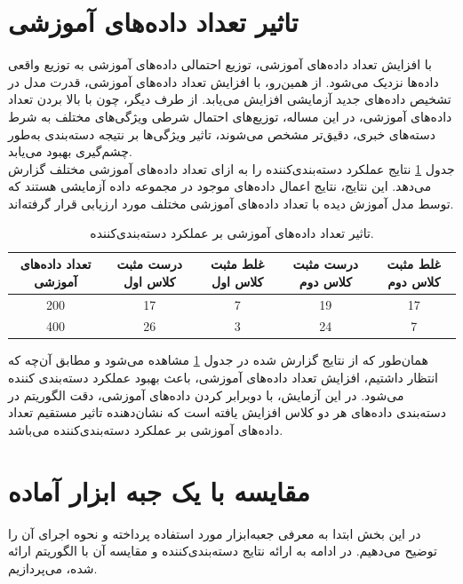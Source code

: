 \documentclass[11.5pt,a4paper]{article}
\begin{document}
\section{تاثیر تعداد داده‌های آموزشی}

با افزایش تعداد داده‌های آموزشی، توزیع احتمالی داده‌های آموزشی به توزیع واقعی داده‌ها نزدیک می‌شود. از همین‌رو، با افزایش تعداد داده‌های آموزشی، قدرت مدل در تشخیص داده‌های جدید آزمایشی افزایش‌ می‌یابد. از طرف دیگر، چون با بالا بردن تعداد داده‌های آموزشی، در این مساله، توزیع‌های احتمال شرطی ویژگی‌های مختلف به شرط دسته‌های خبری، دقیق‌تر مشخص ‌می‌شوند، تاثیر ویژگی‌ها بر نتیجه دسته‌بندی به‌طور چشم‌گیری بهبود می‌یابد. \\
جدول 
\ref{tbl:dataCount}
نتایج عملکرد دسته‌بندی‌کننده را به ازای تعداد داده‌های آموزشی مختلف گزارش می‌دهد. این نتایج، نتایج اعمال داده‌های موجود در مجموعه داده‌ آزمایشی هستند که توسط مدل آموزش دیده با تعداد داده‌های آموزشی مختلف مورد ارزیابی قرار گرفته‌اند.
\\
\begin{table}[h]
\center
\caption{تاثیر تعداد داده‌های آموزشی بر عملکرد دسته‌بندی‌کننده.}
\label{tbl:dataCount}
\begin{tabular}{c | c | c | c | c}
تعداد داده‌های آموزشی & درست مثبت کلاس اول & غلط مثبت کلاس اول & درست مثبت کلاس دوم & غلط مثبت کلاس دوم
\\
\hline
\hline
200 &17&7&19&17
\\
400 &26&3&24&7
\\
\end{tabular}
\end{table}

همان‌طور که از نتایج گزارش شده در جدول 
\ref{tbl:dataCount}
مشاهده می‌شود و مطابق آن‌چه که انتظار داشتیم، افزایش تعداد داده‌های آموزشی، باعث بهبود عملکرد دسته‌بندی کننده می‌شود. در این آزمایش، با دوبرابر کردن داده‌های آموزشی، دقت الگوریتم در دسته‌بندی داده‌های هر دو کلاس افزایش یافته است که نشان‌دهنده تاثیر مستقیم تعداد داده‌های آموزشی بر عملکرد دسته‌بندی‌کننده می‌باشد.

\section{مقایسه با یک جبه ابزار آماده}
در این بخش ابتدا به معرفی جعبه‌ابزار مورد استفاده پرداخته و نحوه اجرای آن را توضیح می‌دهیم. در ادامه به ارائه نتایج دسته‌بندی‌کننده و مقایسه آن با الگوریتم ارائه شده، می‌پردازیم.
\end{document}
